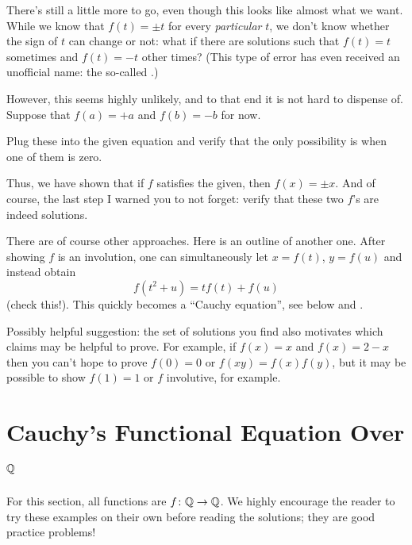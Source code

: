\documentclass[11pt]{scrartcl}
\begin{document}
\begin{soln}
  There's still a little more to go, even though this looks like almost what we want.
  While we know that $f(t) = \pm t$ for every \emph{particular} $t$,
  we don't know whether the sign of $t$ can change or not:
  what if there are solutions such that $f(t) = t$ sometimes and $f(t) = -t$ other times?
  (This type of error has even received an unofficial name:
  the so-called .)

  However, this seems highly unlikely, and to that end it is not hard to dispense of.
  Suppose that $f(a) = +a$ and $f(b) = -b$ for now.
  \begin{exercise}
    Plug these into the given equation and verify that the only possibility
    is when one of them is zero.
  \end{exercise}
  Thus, we have shown that if $f$ satisfies the given, then $f(x) = \pm x$.
  And of course, the last step I warned you to not forget:
  verify that these two $f$'s are indeed solutions.
\end{soln}
\begin{remark}
  There are of course other approaches.
  Here is an outline of another one.
  After showing $f$ is an involution,
  one can simultaneously let $x = f(t)$, $y = f(u)$
  and instead obtain \[ f(t^2 + u) = t f(t) + f(u) \]
  (check this!).
  This quickly becomes a ``Cauchy equation'',
  see below and .
\end{remark}
\begin{remark}
  Possibly helpful suggestion:
  the set of solutions you find also motivates
  which claims may be helpful to prove.
  For example, if $f(x) = x$ and $f(x) = 2-x$
  then you can't hope to prove $f(0)=0$ or $f(xy) = f(x)f(y)$,
  but it may be possible to show $f(1) = 1$ or $f$ involutive,
  for example.
\end{remark}

\section{Cauchy's Functional Equation Over $\mathbb Q$}
For this section, all functions are $f \colon \mathbb Q \to \mathbb Q$.
We highly encourage the reader to try these examples on their own
before reading the solutions;
they are good practice problems!
\end{document}
